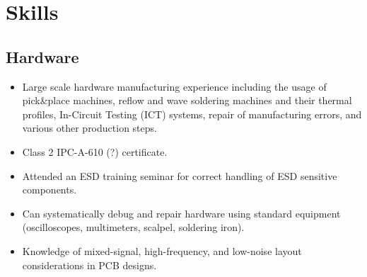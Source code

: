 \documentclass[]{friggeri-cv}
\begin{document}
\section{Skills}

\subsection{Hardware}
\begin{itemize}
    \item Large scale hardware manufacturing experience including the usage of pick\&place machines, reflow and wave soldering machines and their thermal profiles,  In-Circuit Testing (ICT) systems, repair of manufacturing errors, and various other production steps.
    \item Class 2 IPC-A-610 (?) certificate.
    \item Attended an ESD training seminar for correct handling of ESD sensitive components.
    \item Can systematically debug and repair hardware using standard equipment (oscilloscopes, multimeters, scalpel, soldering iron).
    \item Knowledge of mixed-signal, high-frequency, and low-noise layout considerations in PCB designs.
\end{itemize}
\end{document}
